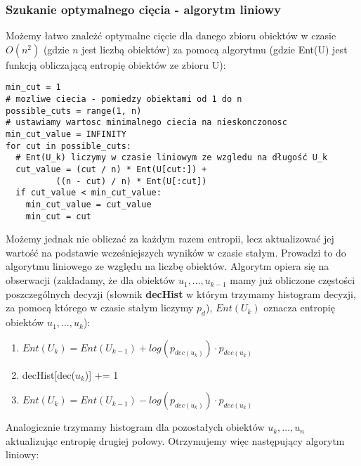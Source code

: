 \documentclass[magisterska]{pracamgr}
\theoremstyle{plain}
\theoremstyle{definition}
\theoremstyle{remark}
\begin{document}
\subsubsection{Szukanie optymalnego cięcia - algorytm liniowy}
Możemy łatwo znależć optymalne cięcie dla danego zbioru obiektów w czasie $O(n^2)$ (gdzie $n$ jest
liczbą obiektów) za pomocą algorytmu (gdzie Ent(U) jest funkcją obliczającą entropię obiektów ze zbioru U):
\begin{lstlisting}
min_cut = 1
# mozliwe ciecia - pomiedzy obiektami od 1 do n
possible_cuts = range(1, n)
# ustawiamy wartosc minimalnego ciecia na nieskonczonosc
min_cut_value = INFINITY
for cut in possible_cuts:
  # Ent(U_k) liczymy w czasie liniowym ze wzgledu na długość U_k
  cut_value = (cut / n) * Ent(U[cut:]) + 
	      ((n - cut) / n) * Ent(U[:cut])
  if cut_value < min_cut_value:
    min_cut_value = cut_value
    min_cut = cut	      
\end{lstlisting}
Możemy jednak nie obliczać za każdym razem entropii, lecz aktualizować jej wartość na podstawie 
wcześniejszych wyników w czasie stałym. Prowadzi to do algorytmu liniowego ze względu na liczbę 
obiektów. Algorytm opiera się na obserwacji (zakładamy, że dla obiektów $u_1, ..., u_{k-1}$ mamy już obliczone 
częstości poszczególnych decyzji (słownik \textbf{decHist} w którym trzymamy histogram decyzji, za pomocą którego w czasie stałym
liczymy $p_d$), $Ent(U_k)$ oznacza entropię obiektów $u_1, ..., u_k$):
\begin{enumerate}
 \item $Ent(U_k) = Ent(U_{k-1}) + log(p_{dec(u_k)}) \cdot p_{dec(u_k)}$
 \item decHist[dec($u_k$)] += 1
 \item $Ent(U_k) = Ent(U_{k-1}) - log(p_{dec(u_k)}) \cdot p_{dec(u_k)}$
\end{enumerate}
Analogicznie trzymamy histogram dla pozostałych obiektów $u_k, ..., u_n$ aktualizując entropię drugiej połowy.
Otrzymujemy więc następujący algorytm liniowy:
\end{document}
